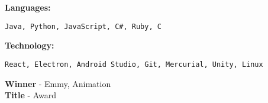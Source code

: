 \documentclass[9pt]{developercv} %
\begin{document}
\vspace*{\fill}
\begin{minipage}[t]{0.6\textwidth} %
	\vspace{-\baselineskip} %
	
    
    \begin{minipage}[t]{0.29 \textwidth}
        \textbf{Languages: }
    \end{minipage}
    \begin{minipage}[t]{0.71 \textwidth}
        \texttt{Java, Python, JavaScript, C\#, Ruby, C}
    \end{minipage}
    
    \begin{minipage}[t]{0.29 \textwidth}
        \textbf{Technology: }
    \end{minipage}
    \begin{minipage}[t]{0.71 \textwidth}
        \texttt{React, Electron, Android Studio, Git, Mercurial, Unity, Linux}
    \end{minipage}
\end{minipage}
\hfill %
\begin{minipage}[t]{0.3\textwidth} %
	\vspace{-\baselineskip} %
	
	
	\textbf{Winner} - Emmy, Animation\\
	\textbf{Title} - Award
\end{minipage}

\end{document}
